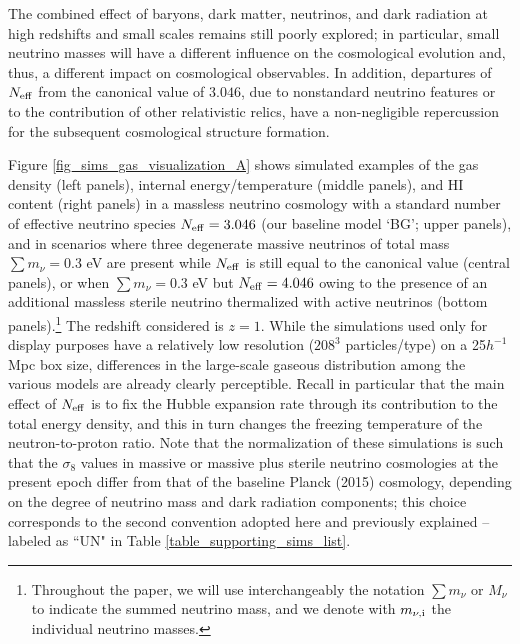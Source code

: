 \documentclass{emulateapj}
\begin{document}

The combined effect of baryons, dark matter, neutrinos, and dark radiation at high redshifts and small scales remains still poorly explored; in particular, 
small neutrino masses will have a different influence on the cosmological evolution and, thus, a different impact on cosmological observables.
In addition, departures of $N_{\rm eff}$ from the canonical value of $3.046$, due to nonstandard neutrino features or to the contribution of
other relativistic relics, have a non-negligible  
repercussion for the subsequent cosmological structure formation.  
 
Figure \ref{fig_sims_gas_visualization_A} shows simulated examples of the gas density (left panels), internal energy/temperature (middle panels), and HI content (right panels) in a massless neutrino cosmology with a standard number of effective
neutrino species $N_{\rm eff} = 3.046$ (our
baseline model `BG'; upper panels), and in scenarios where three degenerate massive neutrinos of total mass $\sum m_{\nu} = 0.3$ eV are present while $N_{\rm eff}$ is still equal to the canonical value (central panels), or when
$\sum m_{\nu}=0.3$ eV but $N_{\rm eff}=4.046$ owing to the presence of an additional massless sterile neutrino thermalized with active neutrinos (bottom panels).\footnote{Throughout the paper, we will use interchangeably the
notation $\sum m_{\nu}$ or $M_{\nu}$ to indicate the summed neutrino mass, and we denote with $m_{\nu, \rm i}$ the individual neutrino masses.}
The redshift considered is $z=1$. 
While the simulations used only for display purposes have a relatively low resolution ($208^3$ particles/type) on a 25$h^{-1}$Mpc box size, differences in the large-scale
gaseous distribution among the various models are already clearly perceptible.   Recall in particular that the main effect of $N_{\rm eff}$ is to fix the Hubble expansion rate through its contribution to the total energy density, and  
this in turn changes the freezing temperature of the neutron-to-proton ratio.
Note that the normalization of these simulations is such that  
the $\sigma_8$ values in massive or massive plus sterile neutrino cosmologies 
at the present epoch  differ from that of the baseline Planck (2015) cosmology, depending on the degree of neutrino mass and dark radiation components; this choice corresponds to the second convention
adopted here and previously explained -- labeled as ``UN" in Table \ref{table_supporting_sims_list}.
 
\end{document}
